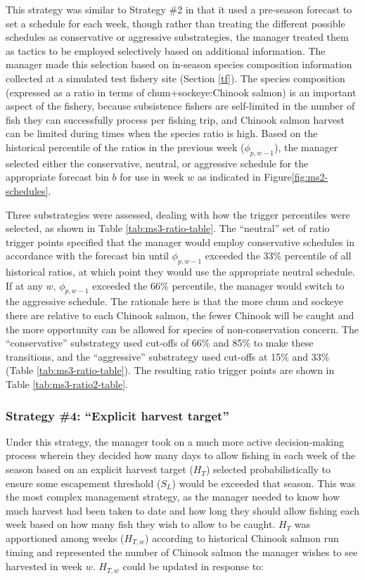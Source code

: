\documentclass[12pt,]{book}
\theoremstyle{definition}
\theoremstyle{definition}
\theoremstyle{definition}
\theoremstyle{remark}
\begin{document}
\noindent
This strategy was similar to Strategy \#2 in that it used a pre-season
forecast to set a schedule for each week, though rather than treating
the different possible schedules as conservative or aggressive
substrategies, the manager treated them as tactics to be employed
selectively based on additional information. The manager made this
selection based on in-season species composition information collected
at a simulated test fishery site (Section \ref{tf}). The species
composition (expressed as a ratio in terms of chum+sockeye:Chinook
salmon) is an important aspect of the fishery, because subsistence
fishers are self-limited in the number of fish they can successfully
process per fishing trip, and Chinook salmon harvest can be limited
during times when the species ratio is high. Based on the historical
percentile of the ratios in the previous week (\(\phi_{p,w-1}\)), the
manager selected either the conservative, neutral, or aggressive
schedule for the appropriate forecast bin \(b\) for use in week \(w\) as
indicated in Figure\ref{fig:ms2-schedules}.

Three substrategies were assessed, dealing with how the trigger
percentiles were selected, as shown in Table \ref{tab:ms3-ratio-table}.
The ``neutral'' set of ratio trigger points specified that the manager
would employ conservative schedules in accordance with the forecast bin
until \(\phi_{p,w-1}\) exceeded the 33\% percentile of all historical
ratios, at which point they would use the appropriate neutral schedule.
If at any \(w\), \(\phi_{p,w-1}\) exceeded the 66\% percentile, the
manager would switch to the aggressive schedule. The rationale here is
that the more chum and sockeye there are relative to each Chinook
salmon, the fewer Chinook will be caught and the more opportunity can be
allowed for species of non-conservation concern. The ``conservative''
substrategy used cut-offs of 66\% and 85\% to make these transitions,
and the ``aggressive'' substrategy used cut-offs at 15\% and 33\% (Table
\ref{tab:ms3-ratio-table}). The resulting ratio trigger points are shown
in Table \ref{tab:ms3-ratio2-table}.

\subsubsection{\texorpdfstring{Strategy \#4: ``Explicit harvest
target''}{Strategy \#4: Explicit harvest target}}\label{strategy-4-explicit-harvest-target}

\noindent
Under this strategy, the manager took on a much more active
decision-making process wherein they decided how many days to allow
fishing in each week of the season based on an explicit harvest target
(\(H_T\)) selected probabilistically to ensure some escapement threshold
(\(S_L\)) would be exceeded that season. This was the most complex
management strategy, as the manager needed to know how much harvest had
been taken to date and how long they should allow fishing each week
based on how many fish they wish to allow to be caught. \(H_T\) was
apportioned among weeks (\(H_{T,w}\)) according to historical Chinook
salmon run timing and represented the number of Chinook salmon the
manager wishes to see harvested in week \(w\). \(H_{T,w}\) could be
updated in response to:
\end{document}

